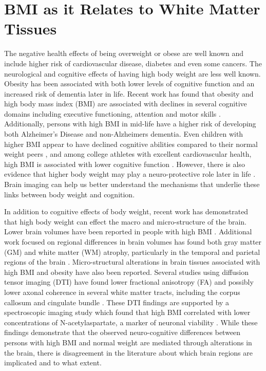\chapter{BMI as it Relates to White Matter Tissues}

	The negative health effects of being overweight or obese are well known and include higher risk of cardiovascular disease, diabetes and even some cancers. The neurological and cognitive effects of having high body weight are less well known. Obesity has been associated with both lower levels of cognitive function and an increased risk of dementia later in life. Recent work has found that obesity and high body mass index (BMI) are associated with declines in several cognitive domains including executive functioning, attention and motor skills \cite{Memel_2016,Yau_2012,Gunstad_2007,Nguyen_2014}. Additionally, persons with high BMI in mid-life have a higher risk of developing both Alzheimer's Disease and non-Alzheimers dementia. Even children with higher BMI appear to have declined cognitive abilities compared to their normal weight peers \cite{Liang_2013}, and among college athletes with excellent cardiovascular health, high BMI is associated with lower cognitive function \cite{Fedor_2013}. However, there is also evidence that higher body weight may play a neuro-protective role later in life \cite{Hsu_2015}. Brain imaging can help us better understand the mechanisms that underlie these links between body weight and cognition.
	
	In addition to cognitive effects of body weight, recent work has demonstrated that high body weight can effect the macro and micro-structure of the brain. Lower brain volumes have been reported in people with high BMI \cite{Ho_2010a,Raji_2009}. Additional work focused on regional differences in brain volumes has found both gray matter (GM) and white matter (WM) atrophy, particularly in the temporal and parietal regions of the brain \cite{Willette_2015}. Micro-structural alterations in brain tissues associated with high BMI and obesity have also been reported. Several studies using diffusion tensor imaging (DTI) have found lower fractional anisotropy (FA) and possibly lower axonal coherence in several white matter tracts, including the corpus callosum and cingulate bundle \cite{Bettcher_2013}. These DTI findings are supported by a spectroscopic imaging study which found that high BMI correlated with lower concentrations of N-acetylaspartate, a marker of neuronal viability \cite{Gazdzinski_2008}. While these findings demonstrate that the observed neuro-cognitive differences between persons with high BMI and normal weight are mediated through alterations in the brain, there is disagreement in the literature about which brain regions are implicated and to what extent.
	

